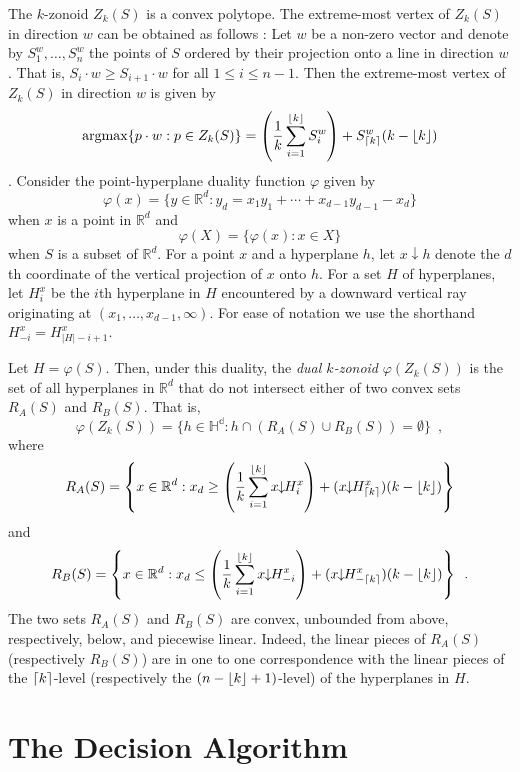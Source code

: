 \documentclass[lotsofwhite]{patmorin}
\newcommand{\argmax}{\mathrm{argmax}}
\newcommand{\drop}{\!\!\downarrow\!\!}
\newcommand{\dual}{\varphi}
\newcommand{\R}{\mathbb{R}}
\begin{document}
The $k$-zonoid $Z_k(S)$ is a convex polytope.  The extreme-most vertex
of $Z_k(S)$ in direction $w$ can be obtained as follows
\cite{gmXX,beXX}:  Let $w$ be a non-zero vector and denote 
by $S_1^w,\ldots,S_n^w$ the points of $S$
ordered by their projection onto a line in direction $w$.  That is,
$S_i\cdot w \ge S_{i+1}\cdot w$ for all $1\le i\le n-1$.  Then the
extreme-most vertex of $Z_k(S)$ in direction $w$ is given by 
\[  
\argmax\{p\cdot w: p\in Z_k(S)\} =
        \left(\frac{1}{k}\sum_{i=1}^{\floor{k}} S_i^w\right) +
          S_{\ceil{k}}^w(k-\floor{k})
\]
\cite{beXX,gmXX}.
Consider the point-hyperplane duality function
$\dual$ given by 
\[
    \dual(x)=\{y\in\R^d : y_d = x_1y_1 +\cdots +x_{d-1}y_{d-1} - x_d \}
\] 
when $x$ is a point in $\R^d$ and
\[
     \dual(X) = \{\dual(x) : x\in X\}
\]
when $S$ is a subset of $\R^d$.  For a point $x$
and a hyperplane $h$, let $x\drop h$ denote the $d$th coordinate of
the vertical projection of $x$ onto $h$.  For a set $H$ of
hyperplanes, let $H_i^x$ be the $i$th hyperplane in $H$ encountered by
a downward vertical ray originating at $(x_1,\ldots,x_{d-1},\infty)$.
For ease of notation we use the shorthand $H_{-i}^x=H_{|H|-i+1}^x$.

Let $H=\dual(S)$.  Then,
under this duality, the \emph{dual $k$-zonoid} $\dual(Z_k(S))$ is the set 
of all hyperplanes in $\R^d$
that do not intersect either of two convex sets $R_A(S)$ and $R_B(S)$.
That is,
\[
     \dual(Z_k(S)) = \{ h\in\mathbb{H^d} : h\cap(R_A(S)\cup R_B(S)) = \emptyset \} \enspace ,
\]
where
\begin{equation}
   R_A(S) = \left\{x\in\R^d: x_d \ge 
\left(\frac{1}{k}\sum_{i=1}^{\floor{k}} x\drop H_i^x\right) +
          (x\drop H_{\ceil{k}}^x)(k-\floor{k}) \right\}  \eqlabel{ra}
\end{equation} 
and
\begin{equation}
   R_B(S) = \left\{x\in\R^d: x_d \le 
\left(\frac{1}{k}\sum_{i=1}^{\floor{k}} x\drop H_{-i}^x\right) +
          (x\drop H_{-\ceil{k}}^x)(k-\floor{k}) \right\} \enspace .
\end{equation}
The two sets $R_A(S)$ and $R_B(S)$ are convex, unbounded from above,
respectively, below, and piecewise linear.  Indeed, the linear pieces
of $R_A(S)$ (respectively $R_B(S)$) are in one to one correspondence
with the linear pieces of the $\left\lceil k \right\rceil$-level (respectively
the $(n-\left\lfloor k \right\rfloor+1)$-level) of the hyperplanes in $H$.


\section{The Decision Algorithm}
\end{document}
